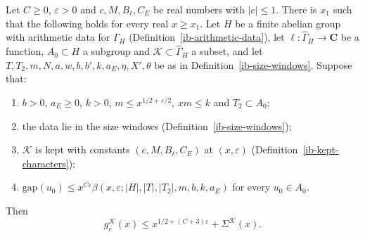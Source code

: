 \begin{theorem}\label{ib-core-window-bound}
Let $C\geq0$, $\varepsilon>0$ and $c,M,B_\ell,C_E$ be real numbers with
$|c|\leq1$. There is $x_1$ such that the following holds for every real
$x\geq x_1$. Let $H$ be a finite abelian group with arithmetic data for
$\Gamma_H$ (Definition~\ref{ib-arithmetic-data}), let
$\ell:\widehat\Gamma_H\to\mathbf C$ be a function, $A_0\subset H$ a subgroup and
$\mathcal K\subset\widehat\Gamma_H$ a subset, and let
$T,T_2,m,N,a,w,b,b',k,a_E,\eta,X',\theta$ be as in
Definition~\ref{ib-size-windows}. Suppose that:
\begin{enumerate}
\item $b>0$, $a_E\geq0$, $k>0$, $m\leq x^{1/2+\varepsilon/2}$, $xm\leq k$ and
  $T_2\subset A_0$;
\item the data lie in the size windows (Definition~\ref{ib-size-windows});
\item $\mathcal K$ is kept with constants $(c,M,B_\ell,C_E)$ at $(x,\varepsilon)$
  (Definition~\ref{ib-kept-characters});
\item $\mathrm{gap}(u_0)\leq x^{C\varepsilon}\beta(x,\varepsilon;|H|,|T|,|T_2|,m,b,k,a_E)$
  for every $u_0\in A_0$.
\end{enumerate}
Then
\[
 g^{\mathcal K}_c(x)\leq x^{1/2+(C+3)\varepsilon}+\Sigma^{\mathcal K}(x).
\]
\end{theorem}
